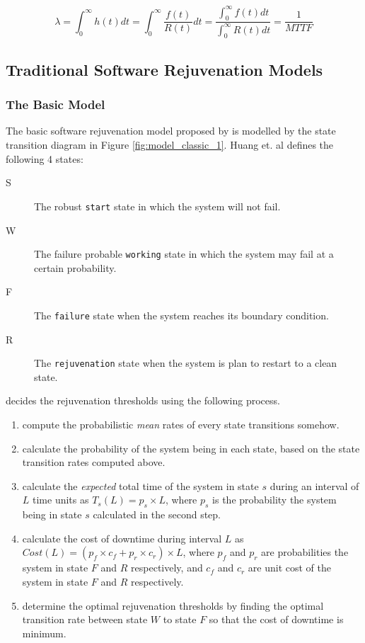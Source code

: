\begin{equation}
 \lambda = \int_{0}^{\infty} h(t) dt = \int_{0}^{\infty} \frac{f(t)}{R(t)}  dt 
=  \frac{\int_{0}^{\infty} f(t) dt}{\int_{0}^{\infty} R(t) dt} = \frac{1}{MTTF}
\label{failure_check}
\end{equation}




\subsection{Traditional Software Rejuvenation Models}

\subsubsection{The Basic Model}


The basic software rejuvenation model proposed by
\citep{huang1995software} is modelled by the state transition diagram in 
Figure \ref{fig:model_classic_1}.  Huang et. al defines the following 4 states:

\begin{description}
  \item[S] The robust {\tt start} state in which the system will not fail.
  \item[W] The failure probable {\tt working} state in which the system may 
fail at a certain probability.
  \item[F] The {\tt failure} state when the system reaches its boundary condition.
  \item[R] The {\tt rejuvenation} state when the system is plan to 
restart to a clean state.
\end{description}

\citep{huang1995software} decides the rejuvenation thresholds using the 
following process.  

\begin{enumerate}
  \item compute the probabilistic {\it mean} rates of every state transitions 
somehow.
  \item calculate the probability of the system being in each state, based on 
the state transition rates computed above.
  \item calculate the {\it expected} total time of the system in state $s$ 
during an interval of $L$ time units as $T_s(L) = p_s \times L$, where $p_s$ is 
the probability the system being in state $s$ calculated in the second step.
  \item calculate the cost of downtime during interval $L$ as $Cost(L) = (p_f 
\times c_f + p_r \times c_r) \times L$, where $p_f$ and $p_r$ are probabilities 
the system in state $F$ and $R$ respectively, and $c_f$ and $c_r$ are unit cost 
of the system in state $F$ and $R$ respectively.
  \item determine the optimal rejuvenation thresholds by finding the optimal 
transition rate between state $W$ to state $F$ so that the cost of downtime is 
minimum.
\end{enumerate} 


